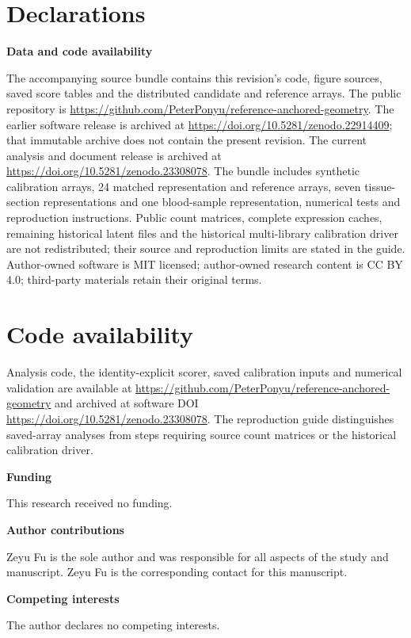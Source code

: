 \documentclass[11pt]{article}
\begin{document}
\section{Declarations}

\noindent\textbf{Data and code availability}\par\nobreak
The accompanying source bundle contains this revision's code, figure sources, saved score tables and the distributed candidate and reference arrays. The public repository is \url{https://github.com/PeterPonyu/reference-anchored-geometry}. The earlier software release is archived at \url{https://doi.org/10.5281/zenodo.22914409}; that immutable archive does not contain the present revision. The current analysis and document release is archived at \url{https://doi.org/10.5281/zenodo.23308078}. The bundle includes synthetic calibration arrays, 24 matched representation and reference arrays, seven tissue-section representations and one blood-sample representation, numerical tests and reproduction instructions. Public count matrices, complete expression caches, remaining historical latent files and the historical multi-library calibration driver are not redistributed; their source and reproduction limits are stated in the guide. Author-owned software is MIT licensed; author-owned research content is CC BY 4.0; third-party materials retain their original terms.

\section*{Code availability}
Analysis code, the identity-explicit scorer, saved calibration inputs and numerical validation are available at \url{https://github.com/PeterPonyu/reference-anchored-geometry} and archived at software DOI \url{https://doi.org/10.5281/zenodo.23308078}. The reproduction guide distinguishes saved-array analyses from steps requiring source count matrices or the historical calibration driver.

\noindent\textbf{Funding}\par\nobreak

This research received no funding.

\noindent\textbf{Author contributions}\par\nobreak

Zeyu Fu is the sole author and was responsible for all aspects of the study and manuscript. Zeyu Fu is the corresponding contact for this manuscript.

\noindent\textbf{Competing interests}\par\nobreak
The author declares no competing interests.

{\footnotesize\raggedright\setlength{\bibsep}{1pt}\setlength{\emergencystretch}{3em}

}
\end{document}

